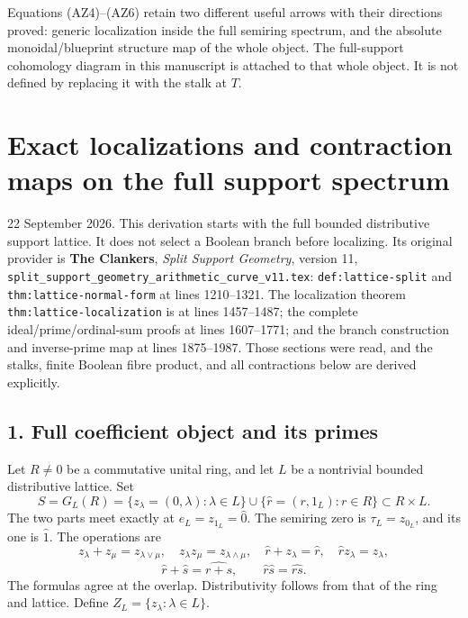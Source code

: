 \documentclass[11pt,a4paper]{article}
\theoremstyle{definition}\newtheorem{definition}[theorem]{Definition}
\begin{document}
Equations (AZ4)--(AZ6) retain two different useful arrows with their
directions proved: generic localization inside the full semiring spectrum,
and the absolute monoidal/blueprint structure map of the whole object.
The full-support cohomology diagram in this manuscript is attached to that
whole object. It is not defined by replacing it with the stalk at $T$.



\section{Exact localizations and contraction maps on the full support
spectrum}\label{exact-localizations-and-contraction-maps-on-the-full-support-spectrum}

22 September 2026. This derivation starts with the full bounded
distributive support lattice. It does not select a Boolean branch before
localizing. Its original provider is \textbf{The Clankers}, \emph{Split
Support Geometry}, version 11,
\nolinkurl{split_support_geometry_arithmetic_curve_v11.tex}:
\nolinkurl{def:lattice-split} and \nolinkurl{thm:lattice-normal-form} at lines
1210--1321.
The localization theorem \nolinkurl{thm:lattice-localization} is at lines 1457--1487; the
complete ideal/prime/ordinal-sum proofs at lines 1607--1771; and the
branch construction and inverse-prime map at lines 1875--1987. Those
sections were read, and the stalks, finite Boolean fibre product, and
all contractions below are derived explicitly.

\subsection{1. Full coefficient object and its
primes}\label{full-coefficient-object-and-its-primes}

Let \(R\ne0\) be a commutative unital ring, and let \(L\) be a
nontrivial bounded distributive lattice. Set \[
 S=G_L(R)=\{z_\lambda=(0,\lambda):\lambda\in L\}
 \cup\{\widehat r=(r,1_L):r\in R\}\subset R\times L.
 \tag{TL1}
\] The two parts meet exactly at \(e_L=z_{1_L}=\widehat0\). The semiring
zero is \(\tau_L=z_{0_L}\), and its one is \(\widehat1\). The operations
are \[
 z_\lambda+z_\mu=z_{\lambda\vee\mu},\quad
 z_\lambda z_\mu=z_{\lambda\wedge\mu},\quad
 \widehat r+z_\lambda=\widehat r,\quad
 \widehat r z_\lambda=z_\lambda,
\] \[
 \widehat r+\widehat s=\widehat{r+s},\qquad
 \widehat r\widehat s=\widehat{rs}.
 \tag{TL2}
\] The formulas agree at the overlap. Distributivity follows from that
of the ring and lattice. Define \(Z_L=\{z_\lambda:\lambda\in L\}\).
\end{document}
